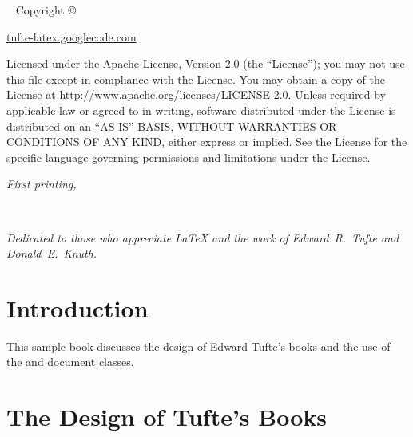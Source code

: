\newpage
\begin{fullwidth}
~\vfill
\thispagestyle{empty}
\setlength{\parindent}{0pt}
\setlength{\parskip}{\baselineskip}
Copyright \copyright\ \the\year\ \thanklessauthor

\par{}


\par\url{tufte-latex.googlecode.com}

\par Licensed under the Apache License, Version 2.0 (the ``License''); you may not
use this file except in compliance with the License. You may obtain a copy
of the License at \url{http://www.apache.org/licenses/LICENSE-2.0}. Unless
required by applicable law or agreed to in writing, software distributed
under the License is distributed on an \textsc{``AS IS'' BASIS, WITHOUT
WARRANTIES OR CONDITIONS OF ANY KIND}, either express or implied. See the
License for the specific language governing permissions and limitations
under the License.

\par\textit{First printing, \monthyear}
\end{fullwidth}

\tableofcontents

\listoffigures

\listoftables

\cleardoublepage
~\vfill
\begin{doublespace}
\noindent\fontsize{18}{22}\selectfont\itshape
\nohyphenation
Dedicated to those who appreciate \LaTeX{} 
and the work of \mbox{Edward R.~Tufte} 
and \mbox{Donald E.~Knuth}.
\end{doublespace}
\vfill
\vfill


\cleardoublepage
\chapter*{Introduction}

This sample book discusses the design of Edward Tufte's
books
and the use of the  and  document 
classes.~\parencite{Tufte2001,Tufte1990,Tufte1997,Tufte2006}


\mainmatter


\chapter{The Design of Tufte's Books}
\label{ch:tufte-design}


